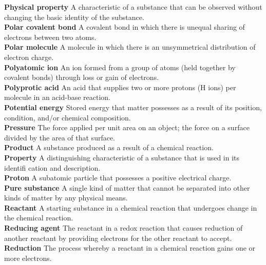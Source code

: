 \documentclass[10pt, roman]{article}
\begin{document}
\noindent \begin{minipage}[c]{0.30\textwidth}
\textbf{Physical property} A characteristic of a substance that can be observed without changing the basic identity of the substance. \\
\textbf{Polar covalent bond} A covalent bond in which there is unequal sharing of electrons between two atoms. \\
\textbf{Polar molecule} A molecule in which there is an unsymmetrical distribution of electron charge. \\
\textbf{Polyatomic ion} An ion formed from a group of atoms (held together by covalent bonds) through loss or gain of electrons. \\
\textbf{Polyprotic acid} An acid that supplies two or more protons (H ions) per molecule in an acid-base reaction. \\
\textbf{Potential energy} Stored energy that matter possesses as a result of its position, condition, and/or chemical composition. \\
\textbf{Pressure} The force applied per unit area on an object; the force on a surface divided by the area of that surface. \\
\textbf{Product} A substance produced as a result of a chemical reaction. \\
\textbf{Property} A distinguishing characteristic of a substance that is used in its identifi cation and description. \\
\textbf{Proton} A subatomic particle that possesses a positive electrical charge. \\
\textbf{Pure substance} A single kind of matter that cannot be separated into other kinds of matter by any physical means. \\
\textbf{Reactant} A starting substance in a chemical reaction that undergoes change in the chemical reaction. \\
\textbf{Reducing agent} The reactant in a redox reaction that causes reduction of another reactant by providing electrons for the other reactant to accept. \\
\textbf{Reduction} The process whereby a reactant in a chemical reaction gains one or more electrons. \\
\end{minipage}%
\hfill
\end{document}
